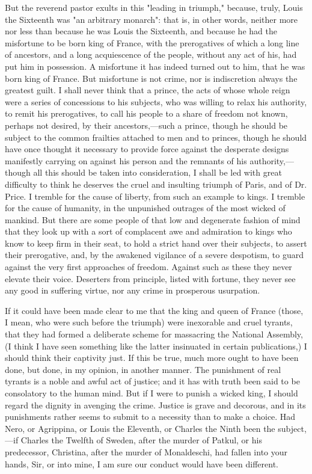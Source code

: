 But the reverend pastor exults in this "leading in triumph," because, truly, Louis the Sixteenth was "an arbitrary monarch": that is, in other words, neither more nor less than because he was Louis the Sixteenth, and because he had the misfortune to be born king of France, with the prerogatives of which a long line of ancestors, and a long acquiescence of the people, without any act of his, had put him in possession. A misfortune it has indeed turned out to him, that he was born king of France. But misfortune is not crime, nor is indiscretion always the greatest guilt. I shall never think that a prince, the acts of whose whole reign were a series of concessions to his subjects, who was willing to relax his authority, to remit his prerogatives, to call his people to a share of freedom not known, perhaps not desired, by their ancestors,—such a prince, though he should be subject to the common frailties attached to men and to princes, though he should have once thought it necessary to provide force against the desperate designs manifestly carrying on against his person and the remnants of his authority,—though all this should be taken into consideration, I shall be led with great difficulty to think he deserves the cruel and insulting triumph of Paris, and of Dr. Price. I tremble for the cause of liberty, from such an example to kings. I tremble for the cause of humanity, in the unpunished outrages of the most wicked of mankind. But there are some people of that low and degenerate fashion of mind that they look up with a sort of complacent awe and admiration to kings who know to keep firm in their seat, to hold a strict hand over their subjects, to assert their prerogative, and, by the awakened vigilance of a severe despotism, to guard against the very first approaches of freedom. Against such as these they never elevate their voice. Deserters from principle, listed with fortune, they never see any good in suffering virtue, nor any crime in prosperous usurpation.

If it could have been made clear to me that the king and queen of France (those, I mean, who were such before the triumph) were inexorable and cruel tyrants, that they had formed a deliberate scheme for massacring the National Assembly, (I think I have seen something like the latter insinuated in certain publications,) I should think their captivity just. If this be true, much more ought to have been done, but done, in my opinion, in another manner. The punishment of real tyrants is a noble and awful act of justice; and it has with truth been said to be consolatory to the human mind. But if I were to punish a wicked king, I should regard the dignity in avenging the crime. Justice is grave and decorous, and in its punishments rather seems to submit to a necessity than to make a choice. Had Nero, or Agrippina, or Louis the Eleventh, or Charles the Ninth been the subject,—if Charles the Twelfth of Sweden, after the murder of Patkul, or his predecessor, Christina, after the murder of Monaldeschi, had fallen into your hands, Sir, or into mine, I am sure our conduct would have been different.

